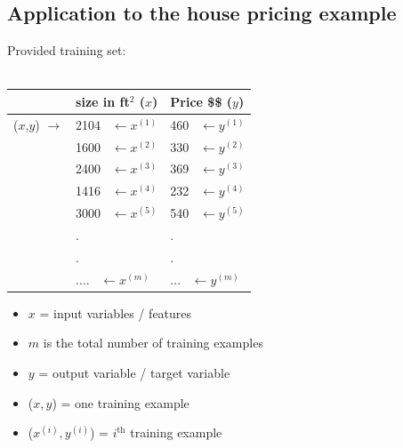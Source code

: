 \documentclass[a4paper,12pt]{report}
\begin{document}
\subsection{Application to the house pricing example}
Provided training set: \\ \\
{
\centering
\begin{tabular}{ p{3cm} |p{3cm}||p{3cm}||  }
\hline
\hline
 & size in ft$^2$ ($x$)& Price \$\$ ($y$)\\
 \hline
 ($x$,$y$) $\rightarrow$ & 2104  \ $\leftarrow x^{(1)}$   & 460 \ $\leftarrow y^{(1)}$\\
 &   1600 \ $\leftarrow x^{(2)}$   & 330 \ $\leftarrow y^{(2)}$\\
 &   2400  \ $\leftarrow x^{(3)}$  & 369 \ $\leftarrow y^{(3)}$\\
 &   1416  \ $\leftarrow x^{(4)}$  & 232 \ $\leftarrow y^{(4)}$\\
 &   3000  \ $\leftarrow x^{(5)}$  & 540 \ $\leftarrow y^{(5)}$\\
 &. &.\\
 &. &.\\
 & .... \ $\leftarrow x^{(m)}$ & ... \ $\leftarrow y^{(m)}$\\
\end{tabular}
}
\begin{itemize}
\item $x$ = input variables / features
\item $m$ is the total number of training examples
\item $y$ = output variable / target variable
\item ($x,y$) = one training example
\item ($x^{(i)},y^{(i)}$) = $i^{\mathrm{th}}$ training example
\end{itemize}
\end{document}
